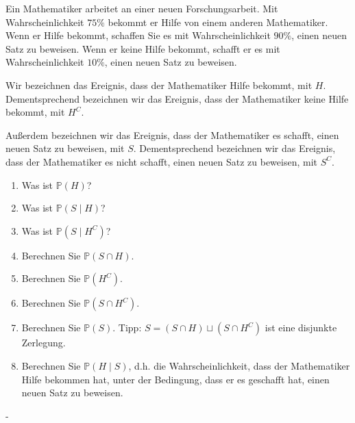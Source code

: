 \documentclass{article}
\begin{document}
\begin{problem}
Ein Mathematiker arbeitet an einer neuen Forschungsarbeit. Mit Wahrscheinlichkeit $75\%$ bekommt er Hilfe von einem anderen Mathematiker. Wenn er Hilfe bekommt, schaffen Sie es mit Wahrscheinlichkeit $90\%$, einen neuen Satz zu beweisen. Wenn er keine Hilfe bekommt, schafft er es mit Wahrscheinlichkeit $10\%$, einen neuen Satz zu beweisen.
\par
Wir bezeichnen das Ereignis, dass der Mathematiker Hilfe bekommt, mit $H$. Dementsprechend bezeichnen wir das Ereignis, dass der Mathematiker keine Hilfe bekommt, mit $H^C$.
\par
Außerdem bezeichnen wir das Ereignis, dass der Mathematiker es schafft, einen neuen Satz zu beweisen, mit $S$. Dementsprechend bezeichnen wir das Ereignis, dass der Mathematiker es nicht schafft, einen neuen Satz zu beweisen, mit $S^C$.
\begin{enumerate}
\item {
Was ist $\mathbb{P}(H)$?
}
\item {
Was ist $\mathbb{P}(S \mid H)$?
}
\item {
Was ist $\mathbb{P}(S \mid H^C)$?
}
\item {
Berechnen Sie $\mathbb{P}(S \cap H)$.
}
\item {
Berechnen Sie $\mathbb{P}(H^C)$.
}
\item {
Berechnen Sie $\mathbb{P}(S \cap H^C)$.
}
\item {
Berechnen Sie $\mathbb{P}(S)$. Tipp: $S = (S \cap H) \sqcup (S \cap H^C)$ ist eine disjunkte Zerlegung.
}
\item {
Berechnen Sie $\mathbb{P}(H \mid S)$, d.h. die Wahrscheinlichkeit, dass der Mathematiker Hilfe bekommen hat, unter der Bedingung, dass er es geschafft hat, einen neuen Satz zu beweisen.
}
\end{enumerate}
\end{problem}

\begin{solution}
-
\end{solution}

\newpage
\end{document}
